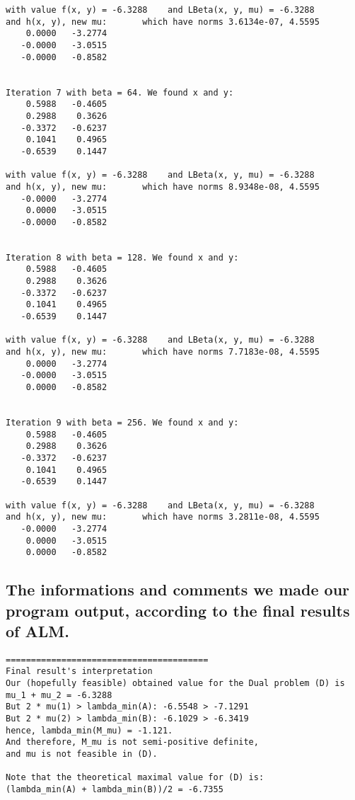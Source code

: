 \documentclass{article}
\begin{document}
\begin{lstlisting}
with value f(x, y) = -6.3288    and LBeta(x, y, mu) = -6.3288
and h(x, y), new mu:       which have norms 3.6134e-07, 4.5595
    0.0000   -3.2774
   -0.0000   -3.0515
   -0.0000   -0.8582


Iteration 7 with beta = 64. We found x and y:
    0.5988   -0.4605
    0.2988    0.3626
   -0.3372   -0.6237
    0.1041    0.4965
   -0.6539    0.1447

with value f(x, y) = -6.3288    and LBeta(x, y, mu) = -6.3288
and h(x, y), new mu:       which have norms 8.9348e-08, 4.5595
   -0.0000   -3.2774
    0.0000   -3.0515
   -0.0000   -0.8582


Iteration 8 with beta = 128. We found x and y:
    0.5988   -0.4605
    0.2988    0.3626
   -0.3372   -0.6237
    0.1041    0.4965
   -0.6539    0.1447

with value f(x, y) = -6.3288    and LBeta(x, y, mu) = -6.3288
and h(x, y), new mu:       which have norms 7.7183e-08, 4.5595
    0.0000   -3.2774
   -0.0000   -3.0515
    0.0000   -0.8582


Iteration 9 with beta = 256. We found x and y:
    0.5988   -0.4605
    0.2988    0.3626
   -0.3372   -0.6237
    0.1041    0.4965
   -0.6539    0.1447

with value f(x, y) = -6.3288    and LBeta(x, y, mu) = -6.3288
and h(x, y), new mu:       which have norms 3.2811e-08, 4.5595
   -0.0000   -3.2774
    0.0000   -3.0515
    0.0000   -0.8582
\end{lstlisting}
\subsection*{The informations and comments we made our program output, according to the final results of ALM.}
\begin{lstlisting}
========================================
Final result's interpretation
Our (hopefully feasible) obtained value for the Dual problem (D) is mu_1 + mu_2 = -6.3288
But 2 * mu(1) > lambda_min(A): -6.5548 > -7.1291
But 2 * mu(2) > lambda_min(B): -6.1029 > -6.3419
hence, lambda_min(M_mu) = -1.121.
And therefore, M_mu is not semi-positive definite,
and mu is not feasible in (D).

Note that the theoretical maximal value for (D) is:
(lambda_min(A) + lambda_min(B))/2 = -6.7355
\end{lstlisting}
\end{document}
